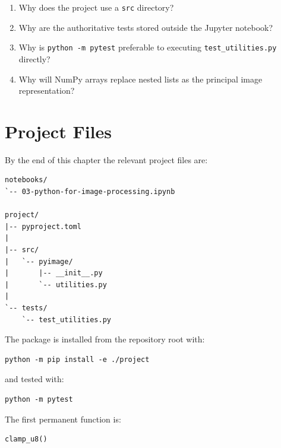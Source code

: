 \begin{enumerate}
    \item Why does the project use a \texttt{src} directory?

    \item Why are the authoritative tests stored outside the Jupyter
    notebook?

    \item Why is \texttt{python -m pytest} preferable to executing
    \texttt{test\_utilities.py} directly?

    \item Why will NumPy arrays replace nested lists as the principal
    image representation?

\end{enumerate}


\section{Project Files}
\label{sec:ch03-project-files}

\begin{projectfiles}

By the end of this chapter the relevant project files are:

\begin{verbatim}
notebooks/
`-- 03-python-for-image-processing.ipynb

project/
|-- pyproject.toml
|
|-- src/
|   `-- pyimage/
|       |-- __init__.py
|       `-- utilities.py
|
`-- tests/
    `-- test_utilities.py
\end{verbatim}

The package is installed from the repository root with:

\begin{verbatim}
python -m pip install -e ./project
\end{verbatim}

and tested with:

\begin{verbatim}
python -m pytest
\end{verbatim}

The first permanent \pyimage{} function is:

\begin{verbatim}
clamp_u8()
\end{verbatim}

\end{projectfiles}


